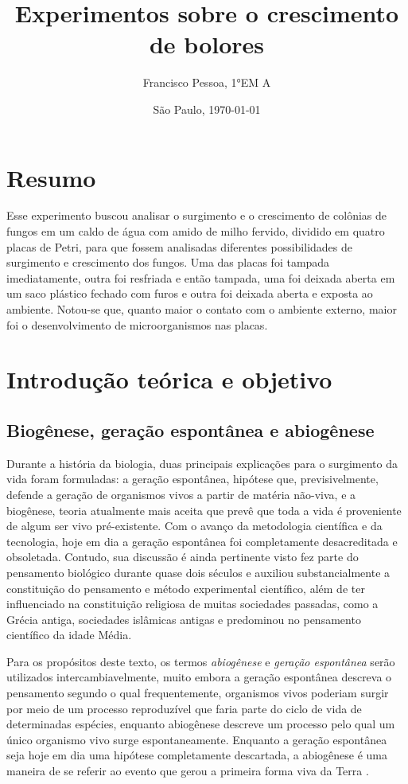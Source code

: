 \documentclass[12pt, titlepage]{article}
\author{Francisco Pessoa, 1°EM A}
\affil{Colégio Ítaca}
\date{São Paulo, \today}
\title{Experimentos sobre o crescimento de bolores}
\begin{document}
\maketitle

\section*{Resumo}
Esse experimento buscou analisar o surgimento e o crescimento de colônias de fungos em um caldo de água com amido de milho fervido, dividido em quatro placas de Petri, para que fossem analisadas diferentes possibilidades de surgimento e crescimento dos fungos. Uma das placas foi tampada imediatamente, outra foi resfriada e então tampada, uma foi deixada aberta em um saco plástico fechado com furos e outra foi deixada aberta e exposta ao ambiente. Notou-se que, quanto maior o contato com o ambiente externo, maior foi o desenvolvimento de microorganismos nas placas.

\section{Introdução teórica e objetivo}
\subsection{Biogênese, geração espontânea e abiogênese}
Durante a história da biologia, duas principais explicações para o surgimento da vida foram formuladas: a geração espontânea, hipótese que, previsivelmente, defende a geração de organismos vivos a partir de matéria não-viva, e a biogênese, teoria atualmente mais aceita que prevê que toda a vida é proveniente de algum ser vivo pré-existente. Com o avanço da metodologia científica e da tecnologia, hoje em dia a geração espontânea foi completamente desacreditada e obsoletada. Contudo, sua discussão é ainda pertinente visto fez parte do pensamento biológico durante quase dois séculos e auxiliou substancialmente a constituição do pensamento e método experimental científico, além de ter influenciado na constituição religiosa de muitas sociedades passadas, como a Grécia antiga, sociedades islâmicas antigas e predominou no pensamento científico da idade Média.

Para os propósitos deste texto, os termos \textit{abiogênese} e \textit{geração espontânea} serão utilizados intercambiavelmente, muito embora a geração espontânea descreva o pensamento segundo o qual frequentemente, organismos vivos poderiam surgir por meio de um processo reproduzível que faria parte do ciclo de vida de determinadas espécies, enquanto abiogênese descreve um processo pelo qual um único organismo vivo surge espontaneamente. Enquanto a geração espontânea seja hoje em dia uma hipótese completamente descartada, a abiogênese é uma maneira de se referir ao evento que gerou a primeira forma viva da Terra \cite{vlaardingerbroek2010abiogenesis}.
\end{document}
